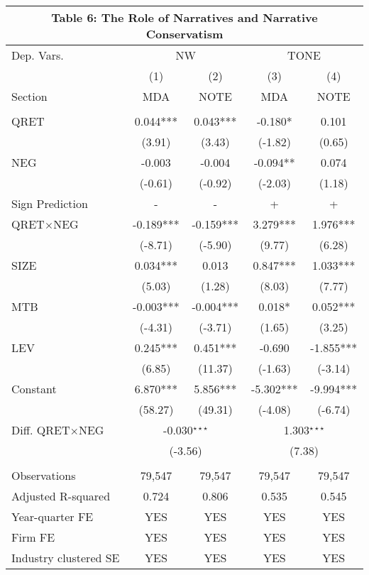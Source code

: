 \begin{table}[htbp] \label{T6}
  \centering
    \begin{tabular}{lcccc}
    \multicolumn{5}{c}{\textbf{Table 6: The Role of Narratives and Narrative Conservatism}} \\
    \midrule
    \midrule
    Dep. Vars.& \multicolumn{2}{c}{NW} & \multicolumn{2}{c}{TONE} \\
    \cmidrule{2-5}
      & (1) & (2) & (3) & (4) \\
    Section & MDA & NOTE & MDA & NOTE \\
    \midrule
      &   &   &   &  \\
    QRET & 0.044*** & 0.043*** & -0.180* & 0.101 \\
      & (3.91) & (3.43) & (-1.82) & (0.65) \\
    NEG & -0.003 & -0.004 & -0.094** & 0.074 \\
      & (-0.61) & (-0.92) & (-2.03) & (1.18) \\
    \rowcolor[rgb]{ .933,  .925,  .882} Sign Prediction & - & - & + & + \\
    \rowcolor[rgb]{ .933,  .925,  .882} QRET$\times$NEG & -0.189*** & -0.159*** & 3.279*** & 1.976*** \\
    \rowcolor[rgb]{ .933,  .925,  .882}   & (-8.71) & (-5.90) & (9.77) & (6.28) \\
    SIZE & 0.034*** & 0.013 & 0.847*** & 1.033*** \\
      & (5.03) & (1.28) & (8.03) & (7.77) \\
    MTB & -0.003*** & -0.004*** & 0.018* & 0.052*** \\
      & (-4.31) & (-3.71) & (1.65) & (3.25) \\
    LEV & 0.245*** & 0.451*** & -0.690 & -1.855*** \\
      & (6.85) & (11.37) & (-1.63) & (-3.14) \\
    Constant & 6.870*** & 5.856*** & -5.302*** & -9.994*** \\
      & (58.27) & (49.31) & (-4.08) & (-6.74) \\
    \rowcolor[rgb]{ .933,  .925,  .882} Diff. QRET$\times$NEG & \multicolumn{2}{c}{ -0.030$^{\star\star\star}$} & \multicolumn{2}{c}{1.303$^{\star\star\star}$} \\
    \rowcolor[rgb]{ .933,  .925,  .882}  & \multicolumn{2}{c}{(-3.56)} & \multicolumn{2}{c}{ (7.38)} \\
      &   &   &   &  \\
    Observations & 79,547 & 79,547 & 79,547 & 79,547 \\
    Adjusted R-squared & 0.724 & 0.806 & 0.535 & 0.545 \\
    Year-quarter FE & YES & YES & YES & YES \\
    Firm FE & YES & YES & YES & YES \\
    Industry clustered SE & YES & YES & YES & YES \\
    \bottomrule
    \bottomrule
    \end{tabular}%
\end{table}%
